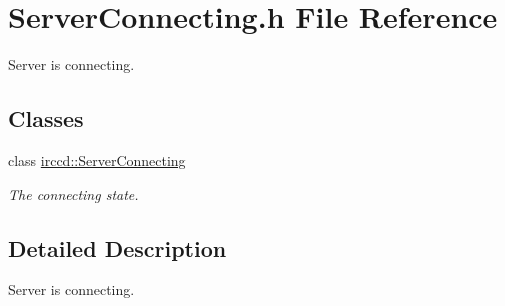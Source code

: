 \hypertarget{a00127}{\section{Server\-Connecting.\-h File Reference}
\label{a00127}
}


Server is connecting.  


\subsection*{Classes}
\begin{DoxyCompactItemize}
\item 
class \hyperlink{a00056}{irccd\-::\-Server\-Connecting}
\begin{DoxyCompactList}\small\item\em The connecting state. \end{DoxyCompactList}\end{DoxyCompactItemize}


\subsection{Detailed Description}
Server is connecting. 